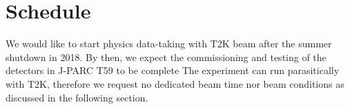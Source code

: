 \section{Schedule}
We would like to start physics data-taking with T2K beam after the summer shutdown in 2018.
By then, we expect the commissioning and testing of the detectors in J-PARC T59 to be complete
The experiment can run parasitically with T2K, therefore we request no dedicated beam time nor beam conditions as discussed in the following section.

